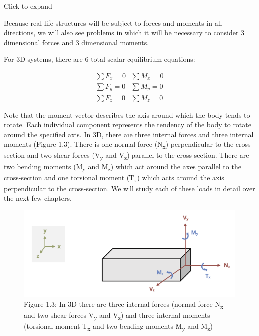 \documentclass[
  letterpaper,
  DIV=11,
  numbers=noendperiod]{scrreprt}
\begin{document}
Click to expand

Because real life structures will be subject to forces and moments in
all directions, we will also see problems in which it will be necessary
to consider 3 dimensional forces and 3 dimensional moments.

For 3D systems, there are 6 total scalar equilibrium equations:

\[
\begin{array}{ll}
\sum F_x=0 & \sum M_x=0 \\
\sum F_y=0 & \sum M_y=0 \\
\sum F_z=0 & \sum M_z=0
\end{array}
\]

Note that the moment vector describes the axis around which the body
tends to rotate. Each individual component represents the tendency of
the body to rotate around the specified axis. In 3D, there are three
internal forces and three internal moments (Figure 1.3). There is one
normal force (N\textsubscript{x}) perpendicular to the cross-section and
two shear forces (V\textsubscript{y} and V\textsubscript{z}) parallel to
the cross-section. There are two bending moments (M\textsubscript{y} and
M\textsubscript{z}) which act around the axes parallel to the
cross-section and one torsional moment (T\textsubscript{x}) which acts
around the axis perpendicular to the cross-section. We will study each
of these loads in detail over the next few chapters.

\begin{figure}[H]

{\centering \includegraphics[width=5.3125in,height=\textheight]{images/CH1 PNGs/figure 1.3.png}

}

\caption{Figure 1.3: In 3D there are three internal forces (normal force
N\textsubscript{x} and two shear forces V\textsubscript{y} and
V\textsubscript{z}) and three internal moments (torsional moment
T\textsubscript{x} and two bending moments M\textsubscript{y} and
M\textsubscript{z})}

\end{figure}%
\end{document}
